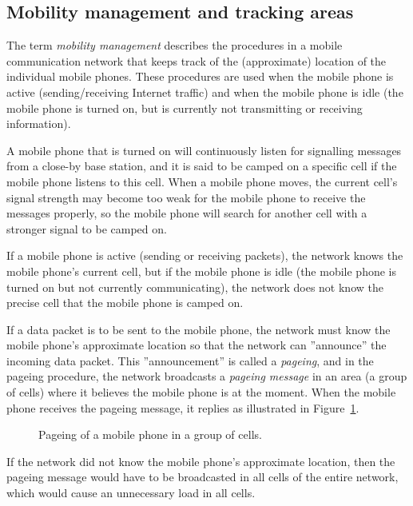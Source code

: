 \subsection{Mobility management and tracking areas}
\label{sec:locationareas}
The term \emph{mobility management} describes the procedures in a mobile communication network that keeps track of the (approximate) location of the individual mobile phones. These procedures are used when the mobile phone is active (\eg sending/receiving Internet traffic) and when the mobile phone is idle (\ie the mobile phone is turned on, but is currently not transmitting or receiving information).

A mobile phone that is turned on will continuously listen for signalling messages from a close-by base station, and it is said to be camped on a specific cell if the mobile phone listens to this cell. When a mobile phone moves, the current cell's signal strength may become too weak for the mobile phone to receive the messages properly, so the mobile phone will search for another cell with a stronger signal to be camped on. 

If a mobile phone is active (\ie sending or receiving packets), the network knows the mobile phone's current cell, but if the mobile phone is idle (\ie the mobile phone is turned on but not currently communicating), the network does not know the precise cell that the mobile phone is camped on.

If a data packet is to be sent to the mobile phone, the network must know the mobile phone's approximate location so that the network can ''announce'' the incoming data packet. This ''announcement'' is called a \emph{pageing}, and in the pageing procedure, the network broadcasts a \emph{pageing message} in an area (a group of cells) where it believes the mobile phone is at the moment. When the mobile phone receives the pageing message, it replies as illustrated in Figure~\ref{fig:pageing}.
\begin{figure}[htbp]
\centering
{}
\caption{\label{fig:pageing}Pageing of a mobile phone in a group of cells.}
\end{figure}

If the network did not know the mobile phone's approximate location, then the pageing message would have to be broadcasted in all cells of the entire network, which would cause an unnecessary load in all cells.


